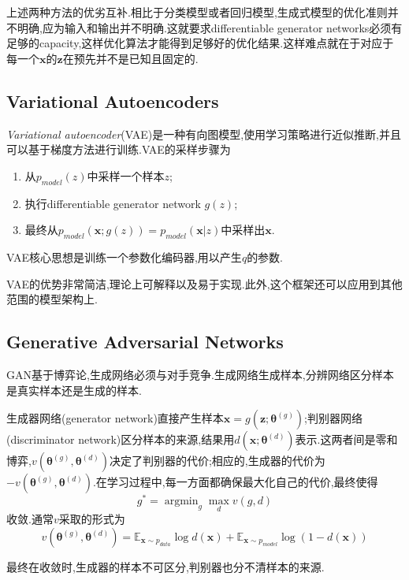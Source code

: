 上述两种方法的优劣互补.相比于分类模型或者回归模型,生成式模型的优化准则并不明确,应为输入和输出并不明确.这就要求differentiable generator networks必须有足够的capacity,这样优化算法才能得到足够好的优化结果.这样难点就在于对应于每一个$\bm x$的$\bm z$在预先并不是已知且固定的.

\subsection{Variational Autoencoders}

\textit{Variational autoencoder}(VAE)是一种有向图模型,使用学习策略进行近似推断,并且可以基于梯度方法进行训练.VAE的采样步骤为
\begin{enumerate}
    \item 从$p_{model}(z)$中采样一个样本$z$;
    \item 执行differentiable generator network $g(z)$;
    \item 最终从$p_{model}(\bm x;g(z))=p_{model}(\bm x|z)$中采样出$\bm x$.
\end{enumerate}

VAE核心思想是训练一个参数化编码器,用以产生$q$的参数.

VAE的优势非常简洁,理论上可解释以及易于实现.此外,这个框架还可以应用到其他范围的模型架构上.

\subsection{Generative Adversarial Networks}

GAN基于博弈论,生成网络必须与对手竞争.生成网络生成样本,分辨网络区分样本是真实样本还是生成的样本.

生成器网络(generator network)直接产生样本$\bm x=g(\bm z;\bm\theta^{(g)})$;判别器网络(discriminator network)区分样本的来源,结果用$d(\bm x;\bm\theta^{(d)})$表示.这两者间是零和博弈,$v(\bm\theta^{(g)},\bm\theta^{(d)})$决定了判别器的代价;相应的,生成器的代价为$-v(\bm\theta^{(g)},\bm\theta^{(d)})$.在学习过程中,每一方面都确保最大化自己的代价,最终使得
\begin{equation}
g^\ast=\mathop{\arg\min}_g\max_dv(g,d)
\end{equation}
收敛.通常$v$采取的形式为
\begin{equation}
v(\bm\theta^{(g)},\bm\theta^{(d)})=\mathbb E_{\mathbf x\sim p_{data}}\log d(\bm x)+\mathbb E_{\mathbf x\sim p_{model}}\log (1-d(\bm x))
\end{equation}

最终在收敛时,生成器的样本不可区分,判别器也分不清样本的来源.

